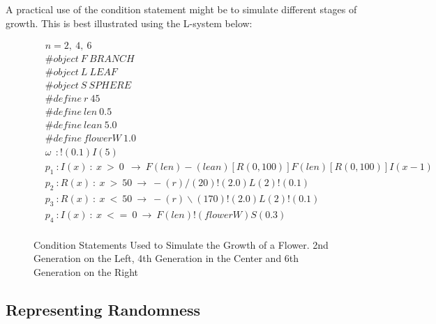 \begin{flushleft}
\vspace{5mm}

A practical use of the condition statement might be to simulate different stages of growth. This is best illustrated using the L-system below: \\

\vspace{5mm}

\begin{figure}[htbp]

\begin{equation} \label{conditional l-system example}
\begin{aligned}
	&n=2,~4,~6 \\
	&\#object~ F~ BRANCH \\
 	&\#object~ L~ LEAF \\
	&\#object~ S~ SPHERE \\
	&\#define~ r~ 45 \\
	&\#define~ len~ 0.5 \\
	&\#define~ lean~ 5.0 \\
	&\#define~ flowerW~ 1.0 \\
	&\omega~~ : !(0.1)I(5)\\
	&p_1~ :  I(x)~ :~ x~ >~ 0~~ \rightarrow~ F(len)-(lean)[R({0, 100})]F(len)[R({0, 100})]I(x-1)\\
	&p_2~ :  R(x)~ :~ x~ >~ 50~ \rightarrow~ -(r)/(20)!(2.0)L(2)!(0.1)\\
	&p_3~ :  R(x)~ :~ x~ <~ 50~ \rightarrow~ -(r)\backslash(170)!(2.0)L(2)!(0.1)\\
	&p_4~ :  I(x)~ :~ x~ <=~ 0~ \rightarrow~ F(len)!(flowerW)S(0.3)\\
\end{aligned}
\end{equation}

	{\centering
		\vspace{7px}
		\setlength{\fboxrule}{1pt}
		\caption{Condition Statements Used to Simulate the Growth of a Flower. 2nd Generation on the Left, 4th Generation in the Center and 6th Generation on the Right}
	}
\end{figure}

\FloatBarrier

\end{flushleft}


\subsection{Representing Randomness} \label{Randomness L-system Subsection}

